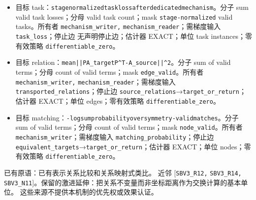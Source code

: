 \documentclass[
  10pt,
]{article}
\begin{document}
\begin{itemize}
\item
  目标
  task：{\small\nolinkurl{stage}\hspace{0.333em}\nolinkurl{normalized}\hspace{0.333em}\nolinkurl{task}\hspace{0.333em}\nolinkurl{loss}\hspace{0.333em}\nolinkurl{after}\hspace{0.333em}\nolinkurl{dedicated}\hspace{0.333em}\nolinkurl{mechanism}}。分子
  sum valid task losses；分母 valid task count；mask
  \nolinkurl{stage-normalized} valid tasks。所有者
  \nolinkurl{mechanism_writer,} \nolinkurl{mechanism_reader}；需梯度输入
  \nolinkurl{task_loss}；停止边 无声明停止边；估计器 EXACT；单位 task
  instances；零有效策略 \nolinkurl{differentiable_zero}。
\item
  目标
  relation：{\small\nolinkurl{mean}\hspace{0.333em}\nolinkurl{||P}\hspace{0.333em}\nolinkurl{A_target}\hspace{0.333em}\nolinkurl{P^T-A_source||^2}}。分子
  sum of valid terms；分母 count of valid terms；mask
  \nolinkurl{edge_valid}。所有者 \nolinkurl{mechanism_writer,}
  \nolinkurl{mechanism_reader}；需梯度输入
  \nolinkurl{transported_relations}；停止边
  \nolinkurl{source_relations}→\nolinkurl{target_or_return}；估计器
  EXACT；单位 edges；零有效策略 \nolinkurl{differentiable_zero}。
\item
  目标
  matching：{\small\nolinkurl{-log}\hspace{0.333em}\nolinkurl{sum}\hspace{0.333em}\nolinkurl{probability}\hspace{0.333em}\nolinkurl{over}\hspace{0.333em}\nolinkurl{symmetry-valid}\hspace{0.333em}\nolinkurl{matches}}。分子
  sum of valid terms；分母 count of valid terms；mask
  \nolinkurl{node_valid}。所有者
  \nolinkurl{mechanism_writer}；需梯度输入
  \nolinkurl{matching_probability}；停止边
  \nolinkurl{equivalent_targets}→\nolinkurl{target_or_return}；估计器
  EXACT；单位 nodes；零有效策略 \nolinkurl{differentiable_zero}。
\end{itemize}

已有原语：已有表示关系比较和关系映射式类比。 近邻
{[}\nolinkurl{SBV3_R12,} \nolinkurl{SBV3_R14,}
\nolinkurl{SBV3_N11}{]}。保留的激进延伸：把关系不变量而非坐标距离作为交换计算的基本单位。
这些来源不提供本机制的优先权或效果认证。
\end{document}
